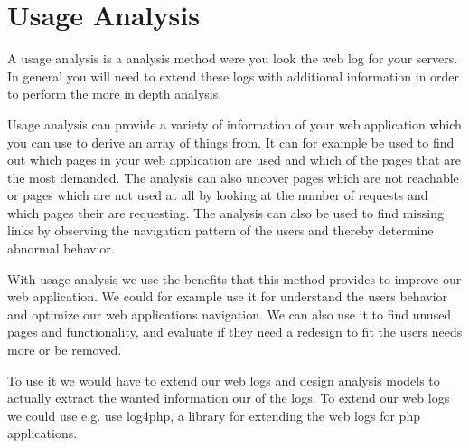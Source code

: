 \section{Usage Analysis}
A usage analysis is a analysis method were you look the web log for your servers. In general you will need to extend these logs with additional information in order to perform the more in depth analysis.

Usage analysis can provide a variety of information of your web application which you can use to derive an array of things from. It can for example be used to find out which pages in your web application are used and which of the pages that are the most demanded. The analysis can also uncover pages which are not reachable or pages which are not used at all by looking at the number of requests and which pages their are requesting.
The analysis can also be used to find missing links by observing the navigation pattern of the users and thereby determine abnormal behavior.

With usage analysis we use the benefits that this method provides to improve our web application. We could for example use it for understand the users behavior and optimize our web applications navigation. We can also use it to find unused pages and functionality, and evaluate if they need a redesign to fit the users needs more or be removed.

To use it we would have to extend our web logs and design analysis models to actually extract the wanted information our of the logs. To extend our web logs we could use e.g. use log4php, a library for extending the web logs for php applications. 